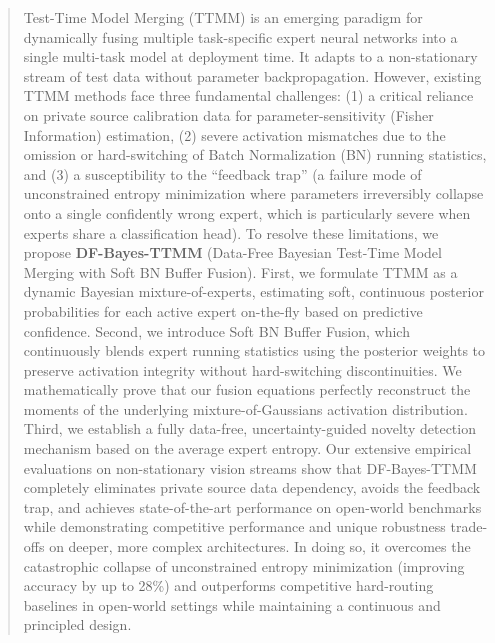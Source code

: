 \documentclass{article}
\theoremstyle{plain}
\theoremstyle{definition}
\theoremstyle{remark}
\begin{document}

\printAffiliationsAndNotice{}

\begin{abstract}
Test-Time Model Merging (TTMM) is an emerging paradigm for dynamically fusing multiple
task-specific expert neural networks into a single multi-task model at deployment time. It adapts to
a non-stationary stream of test data without parameter backpropagation. However, existing TTMM
methods face three fundamental challenges: (1) a critical reliance on private source calibration
data for parameter-sensitivity (Fisher Information) estimation, (2) severe activation mismatches due
to the omission or hard-switching of Batch Normalization (BN) running statistics, and (3) a
susceptibility to the ``feedback trap'' (a failure mode of unconstrained entropy minimization
where parameters irreversibly collapse onto a single confidently wrong expert, which is particularly
severe when experts share a classification head). To resolve
these limitations, we propose \textbf{DF-Bayes-TTMM} (Data-Free Bayesian Test-Time Model Merging
with Soft BN Buffer Fusion). First, we formulate TTMM as a dynamic Bayesian mixture-of-experts,
estimating soft, continuous posterior probabilities for each active expert on-the-fly based on
predictive confidence. Second, we introduce Soft BN Buffer Fusion, which continuously blends expert
running statistics using the posterior weights to preserve activation integrity without
hard-switching discontinuities. We mathematically prove that our fusion equations perfectly
reconstruct the moments of the underlying mixture-of-Gaussians activation distribution. Third, we
establish a fully data-free, uncertainty-guided novelty detection mechanism based on the average
expert entropy. Our extensive empirical evaluations on non-stationary vision streams show that
DF-Bayes-TTMM completely eliminates private source data dependency, avoids the feedback trap, and
achieves state-of-the-art performance on open-world benchmarks while demonstrating competitive performance
and unique robustness trade-offs on deeper, more complex architectures. In
doing so, it overcomes the catastrophic collapse of unconstrained entropy minimization (improving
accuracy by up to 28\%) and outperforms competitive hard-routing baselines in open-world settings
while maintaining a continuous and principled design.
\end{abstract}
\end{document}
